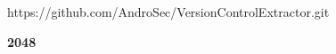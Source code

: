 \documentclass{sig-alternate}
\begin{document}
https://github.com/AndroSec/VersionControlExtractor.git








\textbf{2048}\\


























\end{document}
